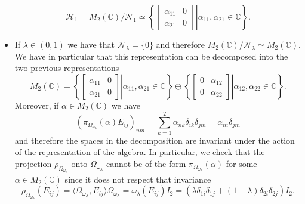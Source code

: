 \begin{example}
\begin{itemize}
\begin{equation}
\mathcal{H}_1=M_2(\mathbb{C})/\mathcal{N}_1\simeq\left\{\left.\begin{bmatrix}
\alpha_{11} & 0 \\
\alpha_{21} & 0
\end{bmatrix}\right|\alpha_{11},\alpha_{21}\in\mathbb{C}\right\}.
\end{equation}
\item If $\lambda \in(0,1)$ we have that $\mathcal{N}_\lambda = \{0\}$ and therefore $M_2(\mathbb{C})/\mathcal{N}_\lambda \simeq M_2(\mathbb{C})$. We have in particular that this representation can be decomposed into the two previous representations
\begin{equation}
M_2(\mathbb{C})=\left\{\left.\begin{bmatrix}
\alpha_{11} & 0 \\
\alpha_{21} & 0
\end{bmatrix}\right|\alpha_{11},\alpha_{21}\in\mathbb{C}\right\}\oplus\left\{\left.\begin{bmatrix}
0 & \alpha_{12} \\
0 & \alpha_{22}
\end{bmatrix}\right|\alpha_{12},\alpha_{22}\in\mathbb{C}\right\}.
\end{equation} 
Moreover, if $\alpha \in M_2(\mathbb{C})$ we have
\begin{equation}
(\pi_{\Omega_{\omega_\lambda}}(\alpha)E_{ij})_{nm}=\sum_{k=1}^2\alpha_{nk}\delta_{ik}\delta_{jm}=\alpha_{ni}\delta_{jm}
\end{equation}
and therefore the spaces in the decomposition are invariant under the action of the representation of the algebra. In particular, we check that the projection $\rho_{\Omega_{\omega_\lambda}}$ onto $\Omega_{\omega_\lambda}$ cannot be of the form $\pi_{\Omega_{\omega_\lambda}}(\alpha)$ for some $\alpha\in M_2(\mathbb{C})$ since it does not respect that invariance
\begin{equation}
\rho_{\Omega_{\omega_\lambda}}(E_{ij})=\langle \Omega_{\omega_\lambda}, E_{ij}\rangle\Omega_{\omega_\lambda} = \omega_\lambda(E_{ij})I_2=(\lambda\delta_{1i}\delta_{1j}+(1-\lambda)\delta_{2i}\delta_{2j})I_2.
\end{equation} 
\end{itemize}
\end{example}

